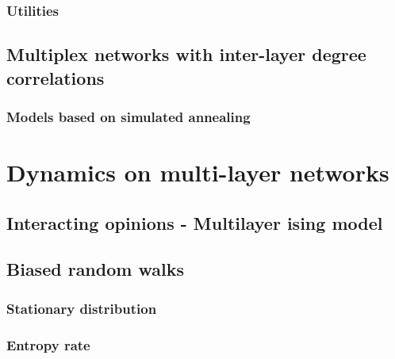 \documentclass[a4paper,11pt]{book}
\begin{document}



\subsection{Utilities}



\section{Multiplex networks with inter-layer degree correlations}

\subsection{Models based on simulated annealing}





\chapter{Dynamics on multi-layer networks}

\section{Interacting opinions - Multilayer ising model}



\section{Biased random walks}

\subsection{Stationary distribution}



\subsection{Entropy rate}




\end{document}
